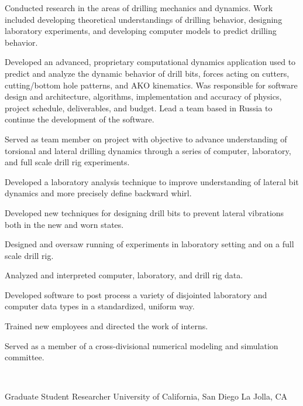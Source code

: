 \documentclass{resume}
\begin{document}
					\vspace*{-6pt}
					\noindent 
				Conducted research in the areas of drilling mechanics and dynamics.  Work included developing theoretical understandings of drilling behavior, designing laboratory experiments, and developing computer models to predict drilling behavior.
			
		\begin{bulletedlist}
			
		\item 
					Developed an advanced, proprietary computational dynamics application used to predict and analyze the dynamic behavior of drill bits, forces acting on cutters, cutting/bottom hole patterns, and AKO kinematics.  Was responsible for software design and architecture, algorithms, implementation and accuracy of physics, project schedule, deliverables, and budget.  Lead a team based in Russia to continue the development of the software.
		\item Served as team member on project with objective to advance understanding of torsional and lateral drilling dynamics through a series of computer, laboratory, and full scale drill rig experiments.
		\item Developed a laboratory analysis technique to improve understanding of lateral bit dynamics and more precisely define backward whirl.
		\item Developed new techniques for designing drill bits to prevent lateral vibrations both in the new and worn states.
		\item Designed and oversaw running of experiments in laboratory setting and on a full scale drill rig.
		\item Analyzed and interpreted computer, laboratory, and drill rig data.
		\item Developed software to post process a variety of disjointed laboratory and computer data types in a standardized, uniform way.
		\item Trained new employees and directed the work of interns.
		\item Served as a member of a cross-divisional numerical modeling and simulation committee.
		\end{bulletedlist}
			\vspace*{-12pt}
	\hspace*{0pt}\\ \vspace*{-2pt}
				
            {Graduate Student Researcher}
            {University of California, San Diego}
			{La Jolla, CA}
			
\end{document}
